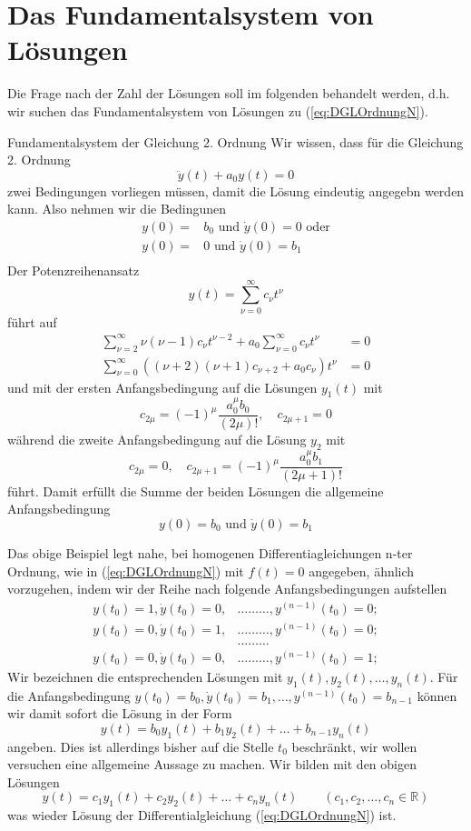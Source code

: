 \section{Das Fundamentalsystem von Lösungen}
Die Frage nach der Zahl der Lösungen soll im folgenden behandelt werden, d.h.
wir suchen das Fundamentalsystem von Lösungen zu (\ref{eq:DGLOrdnungN}).
\begin{example}{Fundamentalsystem der Gleichung 2. Ordnung}
  Wir wissen, dass für die Gleichung 2. Ordnung 
  \[\ddot{y}(t)+a_0y(t)=0 \]
  zwei Bedingungen vorliegen müssen, damit die Lösung eindeutig angegebn werden
  kann. Also nehmen wir die Bedingunen
  \begin{align}
  y(0)=&b_0\mbox{ und }\dot{y}(0)=0\mbox{ oder}\nonumber\\
  y(0)=&0\mbox{ und }\dot{y}(0)=b_1\nonumber\\
  \end{align}
  Der Potenzreihenansatz
  \[ y(t)=\sum\limits_{\nu=0}^\infty c_\nu t^\nu \]
  führt auf
  \begin{align*}
  \sum\limits_{\nu=2}^\infty\nu(\nu-1)c_\nu t^{\nu-2}+a_0\sum\limits_{\nu=0}^\infty c_\nu t^\nu &=0\\
  \sum\limits_{\nu=0}^\infty\left( (\nu+2)(\nu+1)c_{\nu+2} +a_0c_\nu\right) t^\nu &=0
  \end{align*}
  und mit der ersten Anfangsbedingung auf die Lösungen $y_1(t)$ mit
  \[ c_{2\mu}=(-1)^\mu\frac{a_0^\mu b_0}{(2\mu)!},\quad c_{2\mu+1}=0\]
  während die zweite Anfangsbedingung auf die Lösung $y_2$ mit
  \[ c_{2\mu}=0, \quad c_{2\mu+1}=(-1)^\mu\frac{a_0^\mu b_1}{(2\mu+1)!}\]
  führt. Damit erfüllt die Summe der beiden Lösungen die allgemeine
  Anfangsbedingung
  \[ y(0)=b_0\mbox{ und }\dot{y}(0)=b_1\]
\end{example}
Das obige Beispiel legt nahe, bei homogenen Differentiagleichungen n-ter
Ordnung, wie in (\ref{eq:DGLOrdnungN}) mit $f(t)=0$ angegeben, ähnlich
vorzugehen, indem wir der Reihe nach folgende Anfangsbedingungen aufstellen
\begin{align*}
  y(t_0)=1,\dot{y}(t_0)=0,&\dots\dots\dots,y^{(n-1)}(t_0)=0;\\
  y(t_0)=0,\dot{y}(t_0)=1,&\dots\dots\dots,y^{(n-1)}(t_0)=0;\\
  &\dots\dots\dots \\
  y(t_0)=0,\dot{y}(t_0)=0,&\dots\dots\dots,y^{(n-1)}(t_0)=1;
  \label{eq:NICs}
\end{align*}
Wir bezeichnen die entsprechenden Lösungen mit $y_1(t),y_2(t),\dots,y_n(t)$.
Für die Anfangsbedingung
$y(t_0)=b_0,\dot{y}(t_0)=b_1,\dots,y^{(n-1)}(t_0)=b_{n-1}$ können wir damit
sofort die Lösung in der Form
\begin{equation}
  y(t)=b_0y_1(t)+b_1y_2(t)+\dots+b_{n-1}y_n(t)
  \label{eq:FundamentalSuperpose}
\end{equation}
angeben. Dies ist allerdings bisher auf die Stelle $t_0$ beschränkt, wir wollen
versuchen eine allgemeine Aussage zu machen. Wir bilden mit den obigen Lösungen 
\[y(t)=c_1y_1(t)+c_2y_2(t)+\dots+c_ny_n(t)\qquad (c_1,c_2,\dots,c_n\in\mathbb{R})\]
was wieder Lösung der Differentialgleichung (\ref{eq:DGLOrdnungN}) ist.

